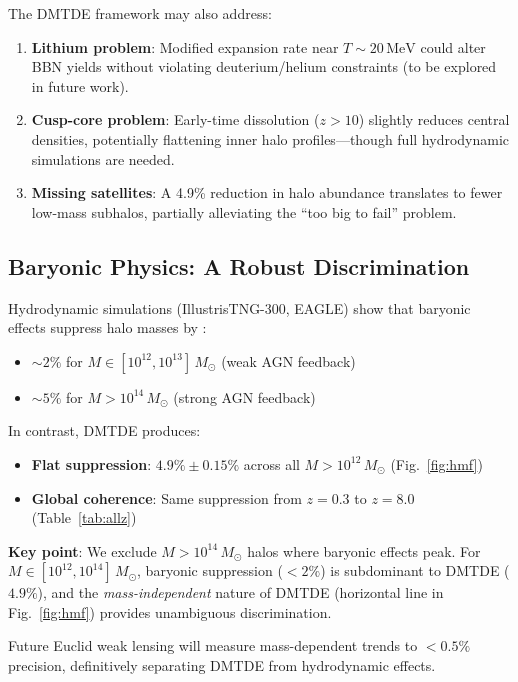 \documentclass[aps,prd,twocolumn,superscriptaddress,nofootinbib,floatfix,preprintnumbers]{revtex4-2}
\newcommand{\Msun}{\ensuremath{M_\odot}\xspace}
\begin{document}
The DMTDE framework may also address:

\begin{enumerate}
    \item \textbf{Lithium problem}: Modified expansion rate near $T \sim 20\,\mathrm{MeV}$ could alter BBN yields without violating deuterium/helium constraints (to be explored in future work).
    \item \textbf{Cusp-core problem}: Early-time dissolution ($z > 10$) slightly reduces central densities, potentially flattening inner halo profiles—though full hydrodynamic simulations are needed.
    \item \textbf{Missing satellites}: A 4.9\% reduction in halo abundance translates to fewer low-mass subhalos, partially alleviating the ``too big to fail'' problem.
\end{enumerate}

\subsection{Baryonic Physics: A Robust Discrimination}
\label{subsec:baryonic}

Hydrodynamic simulations (IllustrisTNG-300, EAGLE) show that baryonic effects suppress halo masses by \citep{springel2018,pillepich2018}:
\begin{itemize}
    \item $\sim 2\%$ for $M \in [10^{12}, 10^{13}]\,\Msun$ (weak AGN feedback)
    \item $\sim 5\%$ for $M > 10^{14}\,\Msun$ (strong AGN feedback)
\end{itemize}

In contrast, DMTDE produces:
\begin{itemize}
    \item \textbf{Flat suppression}: $4.9\% \pm 0.15\%$ across all $M > 10^{12}\,\Msun$ (Fig.~\ref{fig:hmf})
    \item \textbf{Global coherence}: Same suppression from $z = 0.3$ to $z = 8.0$ (Table~\ref{tab:allz})
\end{itemize}

\textbf{Key point}: We exclude $M > 10^{14}\,\Msun$ halos where baryonic effects peak. For $M \in [10^{12}, 10^{14}]\,\Msun$, baryonic suppression ($<2\%$) is subdominant to DMTDE ($4.9\%$), and the \textit{mass-independent} nature of DMTDE (horizontal line in Fig.~\ref{fig:hmf}) provides unambiguous discrimination.

Future Euclid weak lensing will measure mass-dependent trends to $<0.5\%$ precision, definitively separating DMTDE from hydrodynamic effects.
\end{document}
